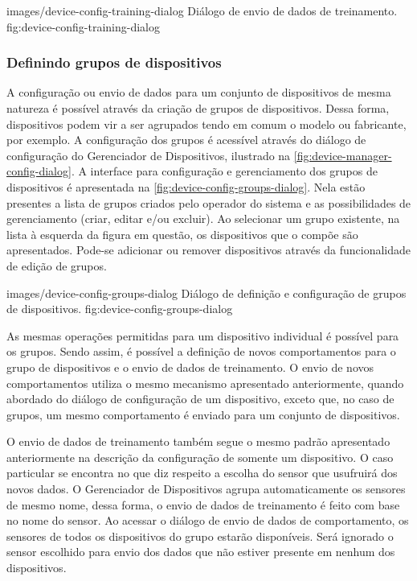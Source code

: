   {images/device-config-training-dialog}
  {Diálogo de envio de dados de treinamento.}
  {fig:device-config-training-dialog}


\subsubsection{Definindo grupos de dispositivos}

A configuração ou envio de dados para um conjunto de dispositivos de mesma natureza é possível
através da criação de grupos de dispositivos. Dessa forma, dispositivos podem vir a ser agrupados
tendo em comum o modelo ou fabricante, por exemplo. A configuração dos grupos é acessível através do
diálogo de configuração do Gerenciador de Dispositivos, ilustrado na
\cref{fig:device-manager-config-dialog}. A interface para configuração e gerenciamento dos grupos de
dispositivos é apresentada na \cref{fig:device-config-groups-dialog}. Nela estão presentes a lista de
grupos criados pelo operador do sistema e as possibilidades de gerenciamento (criar, editar e/ou
excluir). Ao selecionar um grupo existente, na lista à esquerda da figura em questão, os
dispositivos que o compõe são apresentados. Pode-se adicionar ou remover dispositivos através da
funcionalidade de edição de grupos.

  {images/device-config-groups-dialog}
  {Diálogo de definição e configuração de grupos de dispositivos.}
  {fig:device-config-groups-dialog}

As mesmas operações permitidas para um dispositivo individual é possível para os grupos. Sendo
assim, é possível a definição de novos comportamentos para o grupo de dispositivos e o envio de
dados de treinamento. O envio de novos comportamentos utiliza o mesmo mecanismo apresentado
anteriormente, quando abordado do diálogo de configuração de um dispositivo, exceto que, no caso de
grupos, um mesmo comportamento é enviado para um conjunto de dispositivos.


O envio de dados de treinamento também segue o mesmo padrão apresentado anteriormente na descrição
da configuração de somente um dispositivo. O caso particular se encontra no que diz respeito a
escolha do sensor que usufruirá dos novos dados. O Gerenciador de Dispositivos agrupa
automaticamente os sensores de mesmo nome, dessa forma, o envio de dados de treinamento é feito com
base no nome do sensor. Ao acessar o diálogo de envio de dados de comportamento, os sensores de
todos os dispositivos do grupo estarão disponíveis. Será ignorado o sensor escolhido para envio dos
dados que não estiver presente em nenhum dos dispositivos.


